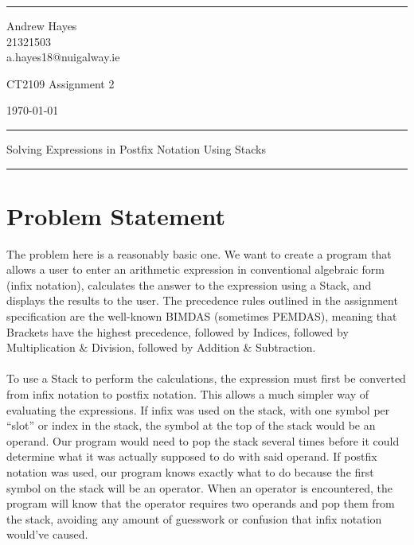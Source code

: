 \documentclass[a4paper]{article}
\begin{document}

\fancyhead[C]{}
\hrule \medskip %
\begin{minipage}{0.295\textwidth} 
    \begin{raggedright}
        \footnotesize
        Andrew Hayes \hfill\\   
        21321503 \hfill\\
        a.hayes18@nuigalway.ie 
    \end{raggedright}
\end{minipage}
\begin{minipage}{0.4\textwidth} 
    \begin{centering}
        \large 
        CT2109 Assignment 2\\ 
        \normalsize 
    \end{centering}
\end{minipage}
\begin{minipage}{0.295\textwidth} 
    \begin{raggedleft}
        \footnotesize
        \today \hfill\\
    \end{raggedleft}
\end{minipage}

\medskip\hrule 
\medskip
\begin{centering}
    Solving Expressions in Postfix Notation Using Stacks\\ 
\end{centering}
\medskip\hrule 
\bigskip

\section{Problem Statement}
The problem here is a reasonably basic one. 
We want to create a program that allows a user to enter an arithmetic expression in conventional algebraic form (infix 
notation), calculates the answer to the expression using a Stack, and displays the results to the user. 
The precedence rules outlined in the assignment specification are the well-known BIMDAS (sometimes PEMDAS), meaning that 
Brackets have the highest precedence, followed by Indices, followed by Multiplication \& Division, followed by Addition 
\& Subtraction.
\\\\
To use a Stack to perform the calculations, the expression must first be converted from infix notation to postfix notation. 
This allows a much simpler way of evaluating the expressions. 
If infix was used on the stack, with one symbol per ``slot'' or index in the stack, the symbol at the top of the stack would 
be an operand. 
Our program would need to pop the stack several times before it could determine what it was actually supposed to do with said
operand. 
If postfix notation was used, our program knows exactly what to do because the first symbol on the stack will be an operator. 
When an operator is encountered, the program will know that the operator requires two operands and pop them from the stack, 
avoiding any amount of guesswork or confusion that infix notation would've caused.
\end{document}

